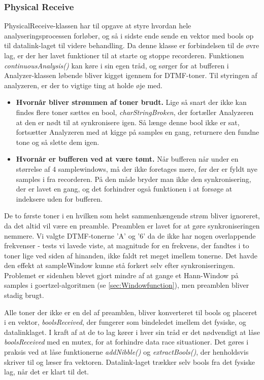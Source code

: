\subsubsection{Physical Receive}

PhysicalReceive-klassen har til opgave at styre hvordan hele analyseringsprocessen forløber, og så i sidste ende sende en vektor med bools op til datalink-laget til videre behandling. Da denne klasse er forbindelsen til de øvre lag, er der her lavet funktioner til at starte og stoppe recorderen. Funktionen \textit{continuousAnalysis()} kan køre i sin egen tråd, og sørger for at bufferen i Analyzer-klassen løbende bliver kigget igennem for DTMF-toner. Til styringen af analyzeren, er der to vigtige ting at holde øje med.

\begin{itemize}

\item \textbf{Hvornår bliver strømmen af toner brudt.} Lige så snart der ikke kan findes flere toner sættes en bool, \textit{charStringBroken}, der fortæller Analyzeren at den er nødt til at synkronisere igen. Så længe denne bool ikke er sat, fortsætter Analyzeren med at kigge på samples en gang, returnere den fundne tone og så slette dem igen. 
\item \textbf{Hvornår er bufferen ved at være tømt.} Når bufferen når under en størrelse af 4 samplewindows, må der ikke foretages mere, før der er fyldt nye samples i fra recorderen. På den måde bryder man ikke den synkronisering, der er lavet en gang, og det forhindrer også funktionen i at forsøge at indeksere uden for bufferen.
\end{itemize}

De to første toner i en hvilken som helst sammenhængende strøm bliver ignoreret, da det altid vil være en preamble. Preamblen er lavet for at gøre synkroniseringen nemmere. Vi valgte DTMF-tonerne 'A' og '6' da de ikke har nogen overlappende frekvenser - tests vi lavede viste, at magnitude for en frekvens, der fandtes i to toner lige ved siden af hinanden, ikke faldt ret meget imellem tonerne. Det havde den effekt at sampleWindow kunne stå forkert selv efter synkroniseringen. Problemet er sidenhen blevet gjort mindre af at gange et Hann-Window på samples i goertzel-algoritmen (se \ref{sec:Windowfunction}), men preamblen bliver stadig brugt. 


Alle toner der ikke er en del af preamblen, bliver konverteret til bools og placeret i en vektor, \textit{boolsReceived}, der fungerer som bindeledet imellem det fysiske, og datalinklaget. I kraft af at de to lag kører i hver sin tråd er det nødvendigt at låse \textit{boolsReceived} med en mutex, for at forhindre data race situationer. Det gøres i praksis ved at låse funktionerne \textit{addNibble()} og \textit{extractBools()}, der henholdsvis skriver til og læser fra vektoren. Datalink-laget trækker selv bools fra det fysiske lag, når det er klart til det.\\


